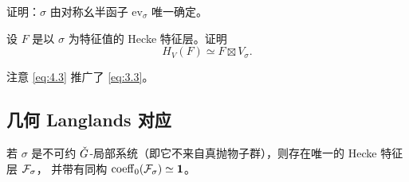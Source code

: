 \begin{exercise}\label{ex:sigma-unique}
证明：\(\sigma\) 由对称幺半函子 \(\mathrm{ev}_\sigma\) 唯一确定。
\end{exercise}

\begin{exercise}\label{ex:eigen-hecke}
设 \(F\) 是以 \(\sigma\) 为特征值的 Hecke 特征层。证明
\begin{equation}\label{eq:4.3}
H_V(F)\simeq F\boxtimes V_\sigma.
\end{equation}
\end{exercise}

\begin{remark}\label{rem:generalize}
注意 \eqref{eq:4.3} 推广了 \eqref{eq:3.3}。
\end{remark}

\subsection{几何 Langlands 对应}

\begin{conjecture}\label{conj:gl}
若 \(\sigma\) 是不可约 \(\check{G}\)-局部系统（即它不来自真抛物子群），则存在唯一的 Hecke 特征层 \(\mathcal{F}_\sigma\)，
并带有同构 \(\operatorname{coeff}_0(\mathcal{F}_\sigma)\simeq\mathbf{1}\)。
\end{conjecture}

